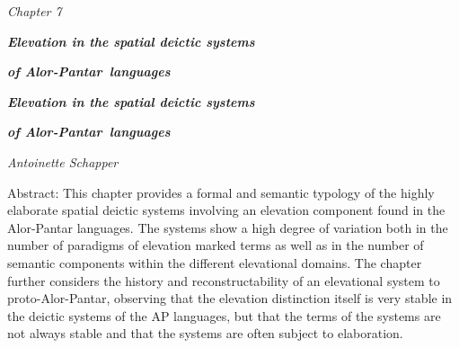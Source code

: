 
\clearpage\setcounter{page}{1}\pagestyle{Standard}
{\centering
\emph{Chapter 7}
\par}

{\centering
\emph{\textbf{\textup{Elevation in the spatial deictic systems}}}
\par}

{\centering
\emph{\textbf{\textup{of Alor-Pantar~languages}}}
\par}


{\centering
\emph{\textbf{\textup{Elevation in the spatial deictic systems}}}
\par}

{\centering
\emph{\textbf{\textup{of Alor-Pantar~languages}}}
\par}

{\centering\itshape
Antoinette Schapper
\par}

Abstract: This chapter provides a formal and semantic typology of the highly elaborate spatial deictic systems involving an elevation component found in the Alor-Pantar languages. The systems show a high degree of variation both in the number of paradigms of elevation marked terms as well as in the number of semantic components within the different elevational domains. The chapter further considers the history and reconstructability of an elevational system to proto-Alor-Pantar, observing that the elevation distinction itself is very stable in the deictic systems of the AP languages, but that the terms of the systems are not always stable and that the systems are often subject to elaboration.

